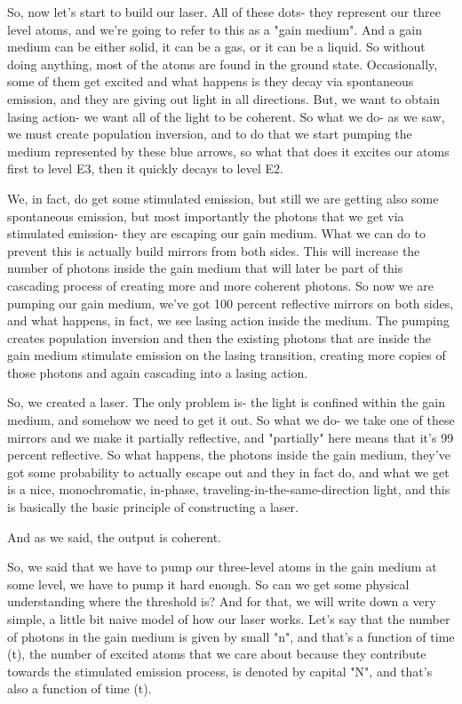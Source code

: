So, now let's start to build our laser. All of these dots- they represent our three level atoms, and we're going to refer to this as a "gain medium". And a gain medium can be either solid, it can be a gas, or it can be a liquid. So without doing anything, most of the atoms are found in the ground state. Occasionally, some of them get excited and what happens is they decay via spontaneous emission, and they are giving out light in all directions. But, we want to obtain lasing action- we want all of the light to be coherent. So what we do- as we saw, we must create population inversion, and to do that we start pumping the medium represented by these blue arrows, so what that does it excites our atoms first to level E3, then it quickly decays to level E2.

We, in fact, do get some stimulated emission, but still we are getting also some spontaneous emission, but most importantly the photons that we get via stimulated emission- they are escaping our gain medium. What we can do to prevent this is actually build mirrors from both sides. This will increase the number of photons inside the gain medium that will later be part of this cascading process of creating more and more coherent photons. So now we are pumping our gain medium, we've got 100 percent reflective mirrors on both sides, and what happens, in fact, we see lasing action inside the medium. The pumping creates population inversion and then the existing photons that are inside the gain medium stimulate emission on the lasing transition, creating more copies of those photons and again cascading into a lasing action.

So, we created a laser. The only problem is- the light is confined within the gain medium, and somehow we need to get it out. So what we do- we take one of these mirrors and we make it partially reflective, and "partially" here means that it's 99 percent reflective. So what happens, the photons inside the gain medium, they've got some probability to actually escape out and they in fact do, and what we get is a nice, monochromatic, in-phase, traveling-in-the-same-direction light, and this is basically the basic principle of constructing a laser.

And as we said, the output is coherent.

So, we said that we have to pump our three-level atoms in the gain medium at some level, we have to pump it hard enough. So can we get some physical understanding where the threshold is? And for that, we will write down a very simple, a little bit naive model of how our laser works. Let's say that the number of photons in the gain medium is given by small "n", and that's a function of time (t), the number of excited atoms that we care about because they contribute towards the stimulated emission process, is denoted by capital "N", and that's also a function of time (t).

